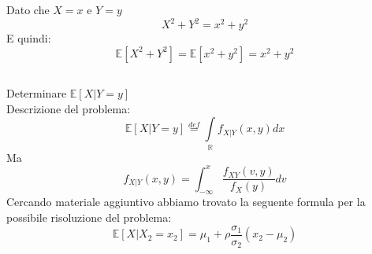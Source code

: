 \documentclass[a4paper]{article}
\newcommand{\E}[0]{\mathbb{E}}
\begin{document}
Dato che $X=x$ e $Y=y$
$$
X^2 + Y^2 = x^2 + y^2
$$
E quindi:
$$
\E[X^2 + Y^2] = \E[x^2 + y^2] =x^2 + y^2 
$$
\subsection{}
Determinare $\E[X|Y=y]$ \\
Descrizione del problema:
$$
\E[X|Y=y]\stackrel{def}{=}\underset{\mathbb{R}}{\int}f_{X|Y}(x,y)dx
$$
Ma
$$
f_{X|Y}(x,y) = \int_{-\infty}^{x}\frac{f_{XY}(v,y)}{f_X(y)}dv
$$
Cercando materiale aggiuntivo abbiamo trovato la seguente formula per la possibile risoluzione del problema:
$$
\E[X|X_2=x_2] = \mu_{1}+\rho\frac{\sigma_1}{\sigma_2}(x_2-\mu_2)
$$
\end{document}
